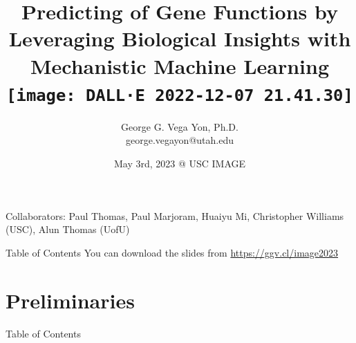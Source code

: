 \documentclass[10pt,aspectratio=169]{beamer}
\title[Predicting Gene Functions with Mech. ML]{Predicting of Gene Functions by Leveraging Biological Insights with Mechanistic Machine Learning\\\texttt{[image: DALL·E 2022-12-07 21.41.30]}\vspace{-.5cm}}
\author[\hyperlink{https://ggv.cl}{https://ggv.cl}]{George G. Vega Yon, Ph.D.\\{\small \color{darkgray}george.vegayon@utah.edu}\vspace{-.5cm}}
\institute[UofUEpi]{Division of Epidemiology @ University of Utah}
\date{May 3rd, 2023 @ USC IMAGE\vspace{-.5cm}}
\newcounter{frame}[frame]
\newcommand{\toc}[0]{\begin{frame}{Table of Contents}
    \tableofcontents[current]
\end{frame}}
\begin{document}
\begin{frame}
    \maketitle
    {\scriptsize Collaborators: Paul Thomas, Paul Marjoram, Huaiyu Mi, Christopher Williams (USC), Alun Thomas (UofU)}
\end{frame}

\begin{frame}{Table of Contents}
    \tableofcontents
    You can download the slides from \url{https://ggv.cl/image2023}
\end{frame}

\section{Preliminaries}\toc{}
\end{document}
